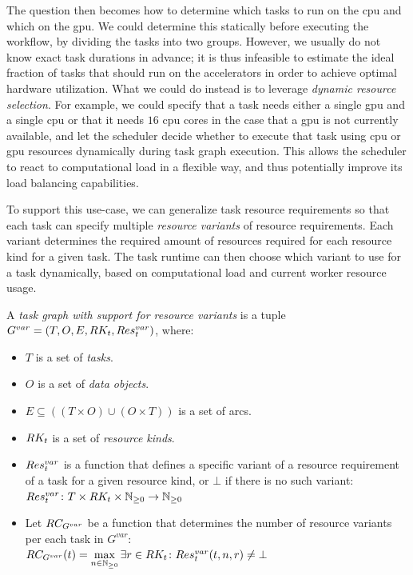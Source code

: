 The question then becomes how to determine which tasks to run on the \gls{cpu} and
which on the \gls{gpu}. We could determine this statically before executing the
workflow, by dividing the tasks into two groups. However, we usually do not know exact task
durations in advance; it is thus infeasible to estimate the ideal fraction of tasks that should run
on the accelerators in order to achieve optimal hardware utilization. What we could do instead is
to leverage \emph{dynamic resource selection}. For example, we could specify that a task needs either a
single \gls{gpu} and a single \gls{cpu} or that it needs
$16$ \gls{cpu} cores in the case that a \gls{gpu} is
not currently available, and let the scheduler decide whether to execute that task using
\gls{cpu} or \gls{gpu} resources dynamically during task graph
execution. This allows the scheduler to react to computational load in a flexible way, and thus
potentially improve its load balancing capabilities.

To support this use-case, we can generalize task resource requirements so that each task can
specify multiple \emph{resource variants} of resource requirements. Each variant determines the
required amount of resources required for each resource kind for a given task. The task runtime can
then choose which variant to use for a task dynamically, based on computational load and current
worker resource usage.

\vspace{2mm} A
\emph{task graph with support for resource variants} is a tuple \\
$G^{var} = (T, O, E, RK_t, Res_t^{var})$, where:
\begin{itemize}[itemsep=0pt]
	\item $T$ is a set of \emph{tasks}.
	\item $O$ is a set of \emph{data objects}.
	\item $E \subseteq ((T\times{}O) \cup (O\times{}T))$ is a set of arcs.
	\item $RK_t$ is a set of \emph{resource kinds}.
	\item $Res_t^{var}$ is a function that defines a specific variant of a resource
	      requirement of a task for a given resource kind, or $\bot$ if there is no such
	      variant: \\ $Res_t^{var}\colon T \times RK_t \times
		      \mathbb{N}_{\geq{}0} \rightarrow
		      \mathbb{N}_{\geq{}0}$
	\item Let $RC_{G^{var}}$ be a function that determines the number of resource variants per each
	      task in $G^{var}$: \\ $RC_{G^{var}}(t) = \max\limits_{n\in\mathbb{N}_{\geq{}0}} \exists
		      r\in RK_t\colon Res_t^{var}(t, n, r) \neq \bot$
\end{itemize}

